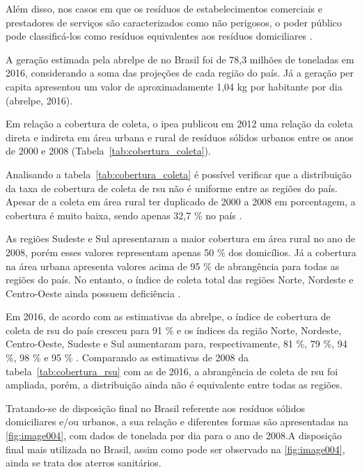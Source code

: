 	Além disso, nos casos em que os resíduos de estabelecimentos comerciais e prestadores de serviços são caracterizados como não perigosos, o poder público pode classificá-los como resíduos equivalentes aos resíduos domiciliares \cite{brasil:12305}.
	
	A geração estimada pela \gls{abrelpe} de  no Brasil foi de 78,3 milhões de toneladas em 2016, considerando a soma das projeções de cada região do país. Já a geração per capita apresentou um valor de aproximadamente 1,04 kg por habitante por dia (\gls{abrelpe}, 2016).
	
	Em relação a cobertura de coleta, o \gls{ipea} publicou em 2012 uma relação da coleta direta e indireta em área urbana e rural de resíduos sólidos urbanos entre os anos de 2000 e 2008 (Tabela~\ref{tab:cobertura_coleta}).
	
	
	
	Analisando a tabela~\ref{tab:cobertura_coleta} é possível verificar que a distribuição da taxa de cobertura de coleta de \gls{rsu} não é uniforme entre as regiões do país. Apesar de a coleta em área rural ter duplicado de 2000 a 2008 em porcentagem, a cobertura é muito baixa, sendo apenas 32,7 \% no país \cite{IPEARSU2012}.
	
	As regiões Sudeste e Sul apresentaram a maior cobertura em área rural no ano de 2008, porém esses valores representam apenas 50 \% dos domicílios. Já a cobertura na área urbana apresenta valores acima de 95 \% de abrangência para todas as regiões do país. No entanto, o índice de coleta total das regiões Norte, Nordeste e Centro-Oeste ainda possuem deficiência \cite{IPEARSU2012}.
	
	Em 2016, de acordo com as estimativas da \gls{abrelpe}, o índice de cobertura de coleta de \gls{rsu} do país cresceu para 91 \% e os índices da região Norte, Nordeste, Centro-Oeste, Sudeste e Sul aumentaram para, respectivamente, 81 \%, 79 \%, 94 \%, 98 \% e 95 \% \cite{abrelpe:2016}. Comparando as estimativas de 2008 da tabela~\ref{tab:cobertura_rsu} com as de 2016, a abrangência de coleta de \gls{rsu} foi ampliada, porém, a distribuição ainda não é equivalente entre todas as regiões.
	
	Tratando-se de disposição final no Brasil referente aos resíduos sólidos domiciliares e/ou urbanos, a sua relação e diferentes formas são apresentadas na \autoref{fig:image004}, com dados de tonelada por dia para o ano de 2008.A disposição final mais utilizada no Brasil, assim como pode ser observado na \autoref{fig:image004}, ainda se trata dos aterros sanitários. 

